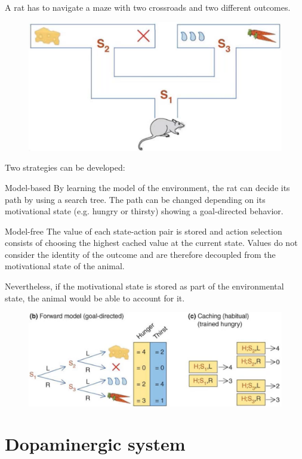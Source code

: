 \begin{example}
    A rat has to navigate a maze with two crossroads and two different outcomes.
    \begin{figure}[H]
        \centering
        \includegraphics[width=0.4\linewidth]{./img/rat_maze1.png}
    \end{figure}

    Two strategies can be developed:
    \begin{descriptionlist}
        \item[Model-based]
            By learning the model of the environment, the rat can decide its path by using a search tree.
            The path can be changed depending on its motivational state (e.g. hungry or thirsty) showing a goal-directed behavior.

        \item[Model-free] 
            The value of each state-action pair is stored and action selection consists of choosing the highest cached value at the current state.
            Values do not consider the identity of the outcome and are therefore decoupled from the motivational state of the animal.

            Nevertheless, if the motivational state is stored as part of the environmental state, the animal would be able to account for it.
    \end{descriptionlist}

    \begin{figure}[H]
        \centering
        \includegraphics[width=0.6\linewidth]{./img/rat_maze2.png}
    \end{figure}
\end{example}



\section{Dopaminergic system}

